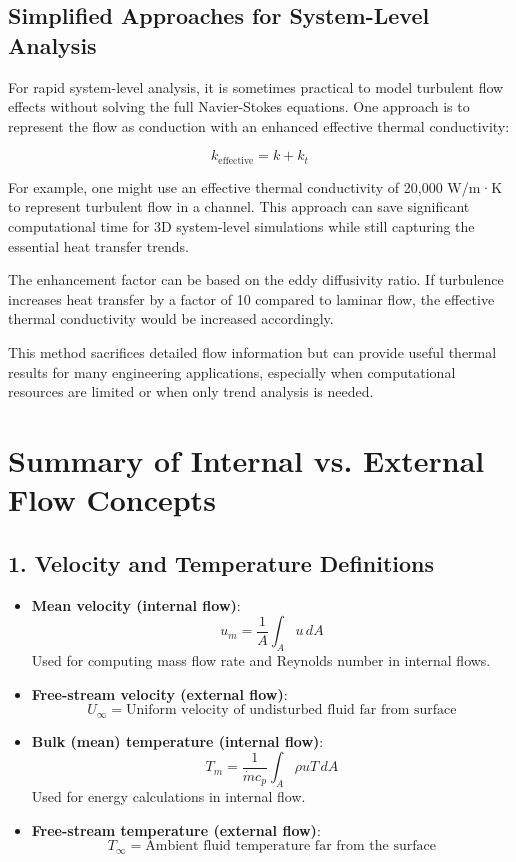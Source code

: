 \subsection*{Simplified Approaches for System-Level Analysis}

For rapid system-level analysis, it is sometimes practical to model turbulent flow effects without solving the full Navier-Stokes equations. One approach is to represent the flow as conduction with an enhanced effective thermal conductivity:

\[
k_{\text{effective}} = k + k_t
\]

For example, one might use an effective thermal conductivity of 20,000 W/m·K to represent turbulent flow in a channel. This approach can save significant computational time for 3D system-level simulations while still capturing the essential heat transfer trends.

The enhancement factor can be based on the eddy diffusivity ratio. If turbulence increases heat transfer by a factor of 10 compared to laminar flow, the effective thermal conductivity would be increased accordingly.

This method sacrifices detailed flow information but can provide useful thermal results for many engineering applications, especially when computational resources are limited or when only trend analysis is needed.


\section*{Summary of Internal vs. External Flow Concepts}

\subsection*{1. Velocity and Temperature Definitions}

\begin{itemize}
    \item \textbf{Mean velocity (internal flow)}:
    \[
    u_m = \frac{1}{A} \int_A u \, dA
    \]
    Used for computing mass flow rate and Reynolds number in internal flows.

    \item \textbf{Free-stream velocity (external flow)}:
    \[
    U_\infty = \text{Uniform velocity of undisturbed fluid far from surface}
    \]

    \item \textbf{Bulk (mean) temperature (internal flow)}:
    \[
    T_m = \frac{1}{\dot{m} c_p} \int_A \rho u T \, dA
    \]
    Used for energy calculations in internal flow.

    \item \textbf{Free-stream temperature (external flow)}:
    \[
    T_\infty = \text{Ambient fluid temperature far from the surface}
    \]
\end{itemize}

